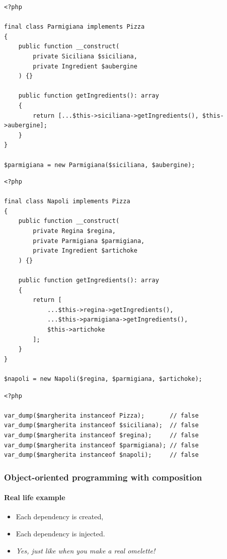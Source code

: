 \begin{frame}[fragile,c]
    \begin{lstlisting}
<?php

final class Parmigiana implements Pizza
{
    public function __construct(
        private Siciliana $siciliana,
        private Ingredient $aubergine
    ) {}

    public function getIngredients(): array
    {
        return [...$this->siciliana->getIngredients(), $this->aubergine];
    }
}

$parmigiana = new Parmigiana($siciliana, $aubergine);
    \end{lstlisting}
\end{frame}

\begin{frame}[fragile,c]
    \begin{lstlisting}
<?php

final class Napoli implements Pizza
{
    public function __construct(
        private Regina $regina,
        private Parmigiana $parmigiana,
        private Ingredient $artichoke
    ) {}

    public function getIngredients(): array
    {
        return [
            ...$this->regina->getIngredients(),
            ...$this->parmigiana->getIngredients(),
            $this->artichoke
        ];
    }
}

$napoli = new Napoli($regina, $parmigiana, $artichoke);
    \end{lstlisting}
\end{frame}

\begin{frame}[fragile,c]
    \begin{lstlisting}
<?php

var_dump($margherita instanceof Pizza);       // false
var_dump($margherita instanceof $siciliana);  // false
var_dump($margherita instanceof $regina);     // false
var_dump($margherita instanceof $parmigiana); // false
var_dump($margherita instanceof $napoli);     // false
    \end{lstlisting}
\end{frame}

\begin{frame}
    \frametitle{Object-oriented programming with composition}
    \framesubtitle{Real life example}

    \begin{itemize}[<+->]
        \item Each dependency is created,
        \item Each dependency is injected.
        \item \textit{Yes, just like when you make a real omelette!}
    \end{itemize}
\end{frame}


